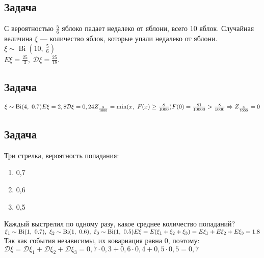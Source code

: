 \documentclass[12pt, a4paper]{article}
\begin{document}
    \subsection*{Задача}
    С вероятностью $\frac{5}{6}$ яблоко падает недалеко от яблони, всего 10 яблок.
    Случайная величина $\xi$ --- количество яблок, которые упали недалеко от яблони.\\
    $\xi \sim \operatorname{Bi}(10,\ \frac{5}{6})$\\
    $E\xi = \frac{25}{3},\ \mathcal{D}\xi = \frac{25}{18}$.
    \subsection*{Задача}
    $\xi \sim \operatorname{Bi}(4,\ 0.7)\\
    E\xi = 2,8\\
    \mathcal{D}\xi = 0,24\\
    Z_{\frac{8}{1000}} = \min(x,\ F(x) \geq \frac{8}{1000})\\
    F(0) = \frac{81}{10000} > \frac{8}{1000}\Rightarrow Z_{\frac{8}{1000}} = 0$
    \subsection*{Задача}
    Три стрелка, вероятность попадания:
    \begin{enumerate}
        \item 0,7
        \item 0,6
        \item 0,5
    \end{enumerate}
    Каждый выстрелил по одному разу, какое среднее количество попаданий?\\
    $\xi_1 \sim \operatorname{Bi}(1,\ 0.7),\ \xi_2 \sim \operatorname{Bi}(1,\ 0.6),\ \xi_3\sim \operatorname{Bi}(1,\ 0.5)\\
    E\xi = E(\xi_1 + \xi_2 + \xi_3) = E\xi_1 + E\xi_2 + E\xi_3 = 1.8$\\
    Так как события независимы, их ковариация равна 0, поэтому:\\
    $\mathcal{D}\xi = \mathcal{D}\xi_1 + \mathcal{D}\xi_2 + \mathcal{D}\xi_3 = 0,7\cdot 0,3 + 0,6\cdot 0,4 + 0,5\cdot 0,5 = 0,7$
\end{document}
